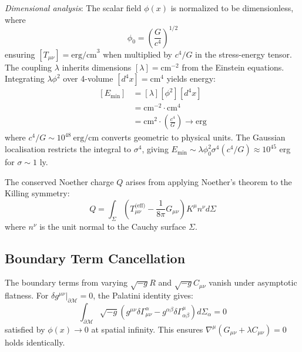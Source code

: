 \documentclass[twocolumn]{article}
\begin{document}
	\emph{Dimensional analysis}: The scalar field \(\phi(x)\) is normalized to be dimensionless, where  
	\begin{equation}
		\phi_0 = \left(\frac{G}{c^4}\right)^{1/2}
\label{eq:phi_normalization}
	\end{equation}
	ensuring \([T_{\mu\nu}] = \text{erg/cm}^3\) when multiplied by \(c^4/G\) in the stress-energy tensor.   The coupling \(\lambda\) inherits dimensions \([\lambda] = \text{cm}^{-2}\) from the Einstein equations. Integrating \(\lambda\phi^2\) over 4-volume \([d^4x] = \text{cm}^4\) yields energy:
	\begin{equation}
		\begin{split}
			[E_{\text{min}}] &= [\lambda][\phi^2][d^4x] \\  
			&= \mathrm{cm}^{-2} \cdot \mathrm{cm}^4 \\  
			&= \mathrm{cm}^2 \cdot \left(\frac{c^4}{G}\right) \rightarrow \mathrm{erg} 
		\end{split}
	\end{equation}
	where \(c^4/G \sim 10^{48}~\text{erg/cm}\) converts geometric to physical units. The Gaussian localisation restricts the integral to \(\sigma^4\), giving \(E_{\text{min}} \sim \lambda \phi_0^2 \sigma^4 (c^4/G) \approx 10^{45}\) erg for \(\sigma \sim 1\) ly.
	
	The conserved Noether charge $Q$ arises from applying Noether's theorem to the Killing symmetry\cite{Wald1984}:
	\begin{equation}
		Q = \int_\Sigma \left( T_{\mu\nu}^{\text{(eff)}} - \frac{1}{8\pi}G_{\mu\nu} \right) K^\mu n^\nu d\Sigma
	\end{equation}
	where $n^\nu$ is the unit normal to the Cauchy surface $\Sigma$.
	
	\subsection{Boundary Term Cancellation}
	The boundary terms from varying $\sqrt{-g}R$ and $\sqrt{-g}C_{\mu\nu}$ vanish under asymptotic flatness. For $\delta g^{\mu\nu}|_{\partial\mathcal{M}} = 0$, the Palatini identity gives:  
	\begin{equation}
		\int_{\partial\mathcal{M}} \sqrt{-g} \left( g^{\mu\nu}\delta\Gamma^\alpha_{\mu\nu} - g^{\alpha\beta}\delta\Gamma^\mu_{\alpha\beta} \right) d\Sigma_\alpha = 0
	\end{equation}
	satisfied by $\phi(x) \to 0$ at spatial infinity\cite{Wald1984,Ashtekar1978}. This ensures $\nabla^\mu(G_{\mu\nu} + \lambda C_{\mu\nu}) = 0$ holds identically.
	
\end{document}
